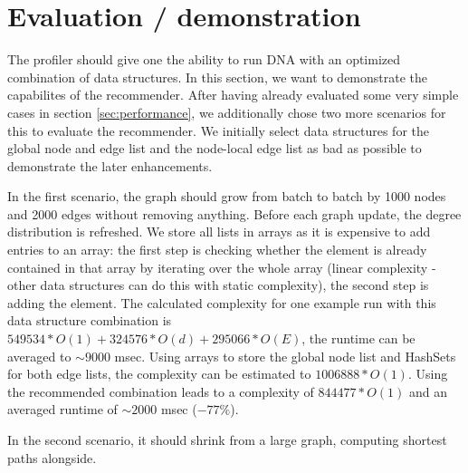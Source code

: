 \section{Evaluation / demonstration}
	The profiler should give one the ability to run DNA with an optimized combination of data
	structures. In this section, we want to demonstrate the capabilites of the recommender.
	After having already evaluated some very simple cases in section \ref{sec:performance},
	we additionally chose two more scenarios for this to evaluate the recommender. We
	initially select data structures for the global node and edge list and the node-local
	edge list as bad as possible to demonstrate the later enhancements.
	
	
	In the first scenario, the graph should grow from batch to batch by 1000 nodes and 2000
	edges without removing anything. Before each graph update, the degree distribution is
	refreshed. We store all lists in arrays as it is expensive to add entries to an array:
	the first step is checking whether the element is already contained in that array by
	iterating over the whole array (linear complexity - other data structures can do this
	with static complexity), the second step is adding the element. The calculated complexity
	for one example run with this data structure combination is $549534*O(1) + 324576*O(d) +
	295066*O(E)$, the runtime can be averaged to $\sim 9000$ msec. Using arrays to store the
	global node list and HashSets for both edge lists, the complexity can be estimated to
	$1006888*O(1)$. Using the recommended combination leads to a complexity of $844477*O(1)$
	and an averaged runtime of $\sim 2000$ msec ($- 77\%$).
	
	
	In the second scenario, it should shrink from a large graph, computing shortest paths
	alongside. 
	
	
